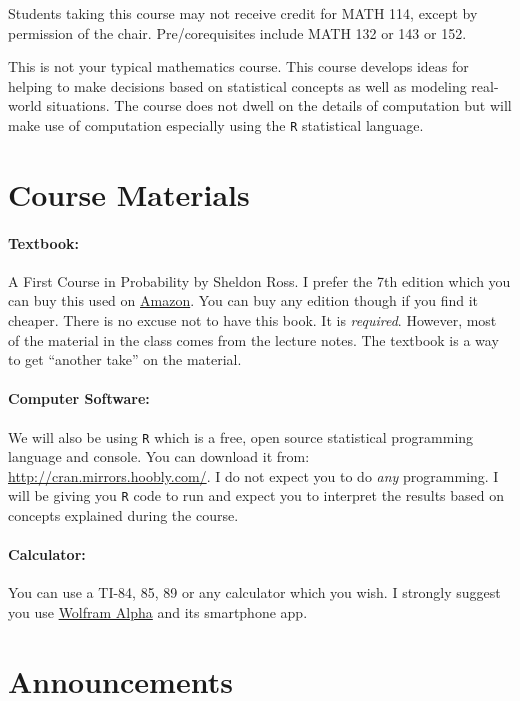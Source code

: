\documentclass[12pt]{article}
\begin{document}
Students taking this course may not receive credit for MATH 114, except by permission of the chair. Pre/corequisites include MATH 132 or 143 or 152.

This is not your typical mathematics course. This course develops ideas for helping to make decisions based on statistical concepts as well as modeling real-world situations. The course does not dwell on the details of computation but will make use of computation especially using the \texttt{R} statistical language.


\section*{Course Materials}

\paragraph{Textbook:} A First Course in Probability by Sheldon Ross. I prefer the 7th edition which you can buy this used on \href{http://www.amazon.com/First-Course-Probability-7th-Edition/dp/0131856626}{Amazon}. You can buy any edition though if you find it cheaper. There is no excuse not to have this book. It is \textit{required}. However, most of the material in the class comes from the lecture notes. The textbook is a way to get ``another take'' on the material.

\paragraph{Computer Software:} We will also be using \texttt{R} which is a free, open source statistical programming language and console. You can download it from: \url{http://cran.mirrors.hoobly.com/}. I do not expect you to do \textit{any} programming. I will be giving you \texttt{R} code to run and expect you to interpret the results based on concepts explained during the course.

\paragraph{Calculator:} You can use a TI-84, 85, 89 or any calculator which you wish. I strongly suggest you use \href{http://www.wolframalpha.com/}{Wolfram Alpha} and its smartphone app.

\section*{Announcements}
\end{document}
